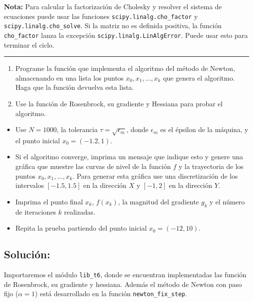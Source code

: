 \documentclass[11pt]{article}
\providecommand{\tightlist}{%
      \setlength{\itemsep}{0pt}\setlength{\parskip}{0pt}}
\begin{document}
\textbf{Nota:} Para calcular la factorización de Cholesky y resolver el
sistema de ecuaciones puede usar las funciones
\texttt{scipy.linalg.cho\_factor} y \texttt{scipy.linalg.cho\_solve}. Si
la matriz no es definida positiva, la función \texttt{cho\_factor} lanza
la excepción \texttt{scipy.linalg.LinAlgError}. Puede usar esto para
terminar el ciclo.

\begin{center}\rule{0.5\linewidth}{0.5pt}\end{center}

\begin{enumerate}
\def\labelenumi{\arabic{enumi}.}
\tightlist
\item
  Programe la función que implementa el algoritmo del método de Newton,
  almacenando en una lista los puntos \(x_0, x_1, ..., x_k\) que genera
  el algoritmo. Haga que la función devuelva esta lista.
\item
  Use la función de Rosenbrock, su gradiente y Hessiana para probar el
  algoritmo.
\end{enumerate}

\begin{itemize}
\tightlist
\item
  Use \(N=1000\), la tolerancia \(\tau = \sqrt{\epsilon_m}\), donde
  \(\epsilon_m\) es el épsilon de la máquina, y el punto inicial
  \(x_0= (-1.2, 1)\).
\item
  Si el algoritmo converge, imprima un mensaje que indique esto y genere
  una gráfica que muestre las curvas de nivel de la función \(f\) y la
  trayectoria de los puntos \(x_0, x_1, ..., x_k\). Para generar esta
  gráfica use una discretización de los intervalos \([-1.5, 1.5]\) en la
  dirección \(X\) y \([-1, 2]\) en la dirección \(Y\).
\item
  Imprima el punto final \(x_k\), \(f(x_k)\), la magnitud del gradiente
  \(g_k\) y el número de iteraciones \(k\) realizadas.
\item
  Repita la prueba partiendo del punto inicial \(x_0= (-12, 10)\).
\end{itemize}

\hypertarget{soluciuxf3n}{%
\subsection{Solución:}\label{soluciuxf3n}}

Importaremos el módulo \texttt{lib\_t6}, donde se encuentran
implementadas las función de Rosenbrock, su gradiente y hessiana. Además
el método de Newton con paso fijo (\(\alpha=1\)) está desarrollado en la
función \texttt{newton\_fix\_step}.
\end{document}
